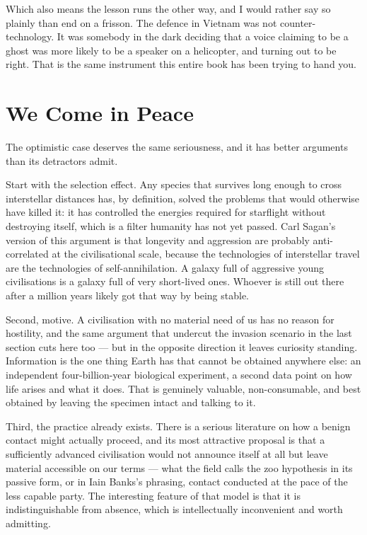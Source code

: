 Which also means the lesson runs the other way, and I would rather say so plainly than end on a
frisson. The defence in Vietnam was not counter-technology. It was somebody in the dark deciding that
a voice claiming to be a ghost was more likely to be a speaker on a helicopter, and turning out to be
right. That is the same instrument this entire book has been trying to hand you.

\section{We Come in Peace}\label{sec:wecomepeace}

The optimistic case deserves the same seriousness, and it has better arguments than its detractors
admit.

Start with the selection effect. Any species that survives long enough to cross interstellar
distances has, by definition, solved the problems that would otherwise have killed it: it has
controlled the energies required for starflight without destroying itself, which is a filter humanity
has not yet passed. Carl Sagan's version of this argument is that longevity and aggression are
probably anti-correlated at the civilisational scale, because the technologies of interstellar travel
are the technologies of self-annihilation. A galaxy full of aggressive young civilisations is a galaxy
full of very short-lived ones. Whoever is still out there after a million years likely got that way
by being stable.

Second, motive. A civilisation with no material need of us has no reason for hostility, and the same
argument that undercut the invasion scenario in the last section cuts here too --- but in the
opposite direction it leaves curiosity standing. Information is the one thing Earth has that cannot
be obtained anywhere else: an independent four-billion-year biological experiment, a second data point
on how life arises and what it does. That is genuinely valuable, non-consumable, and best obtained by
leaving the specimen intact and talking to it.

Third, the practice already exists. There is a serious literature on how a benign contact might
actually proceed, and its most attractive proposal is that a sufficiently advanced civilisation would
not announce itself at all but leave material accessible on our terms --- what the field calls the
zoo hypothesis in its passive form, or in Iain Banks's phrasing, contact conducted at the pace of
the less capable party. The interesting feature of that model is that it is indistinguishable from
absence, which is intellectually inconvenient and worth admitting.

